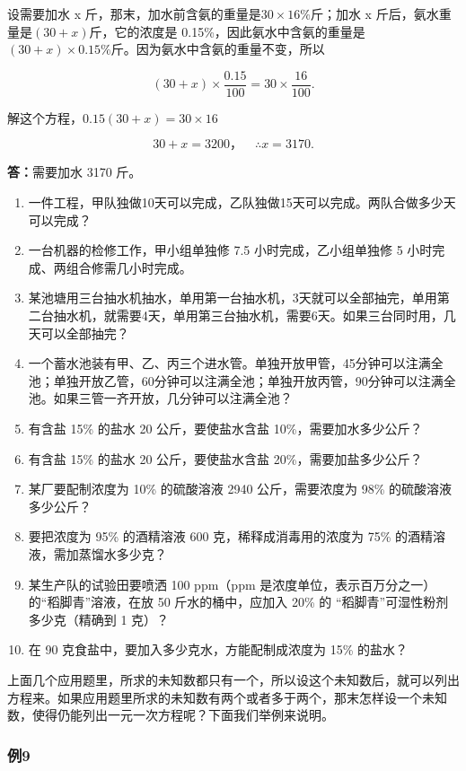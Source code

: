  设需要加水 x
斤，那末，加水前含氨的重量是\(30 \times 16\%\)斤；加水 x
斤后，氨水重量是\((30 + x)\)斤，它的浓度是
0.15\%，因此氨水中含氨的重量是\((30 + x) \times 0.15\%\)斤。因为氨水中含氨的重量不变，所以

\[
(30 + x) \times \frac{0.15}{100} = 30 \times \frac{16}{100}.
\]

解这个方程，\(0.15(30+x)=30\times16\)

\[
30 + x = 3200\text{，} \quad \therefore x = 3170.
\]

\textbf{答：}需要加水 3170 斤。

\begin{enumerate}
\item
  一件工程，甲队独做10天可以完成，乙队独做15天可以完成。两队合做多少天可以完成？
\item
  一台机器的检修工作，甲小组单独修 7.5 小时完成，乙小组单独修 5
  小时完成、两组合修需几小时完成。
\item
  某池塘用三台抽水机抽水，单用第一台抽水机，3天就可以全部抽完，单用第二台抽水机，就需要4天，单用第三台抽水机，需要6天。如果三台同时用，几天可以全部抽完？
\item
  一个蓄水池装有甲、乙、丙三个进水管。单独开放甲管，45分钟可以注满全池；单独开放乙管，60分钟可以注满全池；单独开放丙管，90分钟可以注满全池。如果三管一齐开放，几分钟可以注满全池？
\item
  有含盐 15\% 的盐水 20 公斤，要使盐水含盐 10\%，需要加水多少公斤？
\item
  有含盐 15\% 的盐水 20 公斤，要使盐水含盐 20\%，需要加盐多少公斤？
\item
  某厂要配制浓度为 10\% 的硫酸溶液 2940 公斤，需要浓度为 98\%
  的硫酸溶液多少公斤？
\item
  要把浓度为 95\% 的酒精溶液 600 克，稀释成消毒用的浓度为 75\%
  的酒精溶液，需加蒸馏水多少克？
\item
  某生产队的试验田要喷洒 100 ppm（ppm
  是浓度单位，表示百万分之一）的``稻脚青''溶液，在放 50
  斤水的桶中，应加入 20\% 的 ``稻脚青''可湿性粉剂多少克（精确到 1 克）？
\item
  在 90 克食盐中，要加入多少克水，方能配制成浓度为 15\% 的盐水？
\end{enumerate}

上面几个应用题里，所求的未知数都只有一个，所以设这个未知数后，就可以列出方程来。如果应用题里所求的未知数有两个或者多于两个，那末怎样设一个未知数，使得仍能列出一元一次方程呢？下面我们举例来说明。

\subsubsection{例9}

